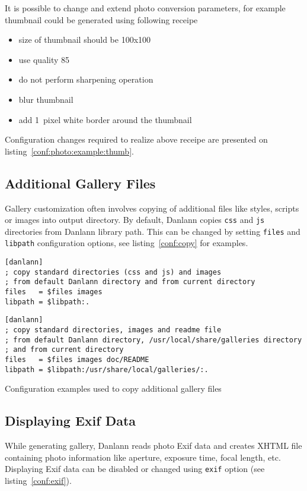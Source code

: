 \documentclass{article}
\begin{document}
It is possible to change and extend photo conversion parameters, for example
thumbnail could be generated using following receipe
\begin{itemize}
\item size of thumbnail should be 100x100
\item use quality 85
\item do not perform sharpening operation
\item blur thumbnail 
\item add 1~pixel white border around the thumbnail
\end{itemize}
Configuration changes required to realize above receipe are presented on
listing~\ref{conf:photo:example:thumb}.

\subsection{Additional Gallery Files}\label{files}
Gallery customization often involves copying of additional files like
styles, scripts or images into output directory. By default, Danlann copies
\texttt{css} and \texttt{js} directories from Danlann library path. This
can be changed by setting \texttt{files} and \texttt{libpath} configuration
options, see listing~\ref{conf:copy} for examples.

\begin{listing}
\begin{lstlisting}
[danlann]
; copy standard directories (css and js) and images
; from default Danlann directory and from current directory
files   = $files images
libpath = $libpath:.
\end{lstlisting}

\begin{lstlisting}
[danlann]
; copy standard directories, images and readme file
; from default Danlann directory, /usr/local/share/galleries directory
; and from current directory
files   = $files images doc/README
libpath = $libpath:/usr/share/local/galleries/:.
\end{lstlisting}
\caption{Configuration examples used to copy additional gallery files}\label{conf:copy}
\end{listing}

\subsection{Displaying Exif Data}\label{exif}
While generating gallery, Danlann reads photo Exif data and creates
XHTML file containing photo information like aperture,
exposure time, focal length, etc. Displaying Exif data can be disabled
or changed using \texttt{exif} option (see listing~\ref{conf:exif}).
\end{document}
